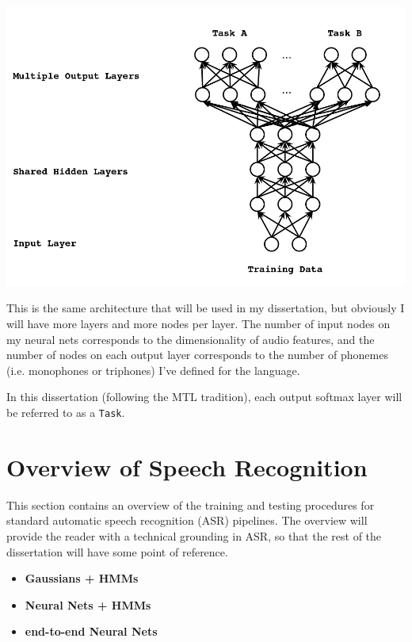 \documentclass[10pt,a4paper]{article}
\begin{document}
\begin{center}
\includegraphics[width=.85\textwidth,keepaspectratio]{figs/heigold-2013-dnn-c.png}
\end{center}

This is the same architecture that will be used in my dissertation, but obviously I will have more layers and more nodes per layer. The number of input nodes on my neural nets corresponds to the dimensionality of audio features, and the number of nodes on each output layer corresponds to the number of phonemes (i.e. monophones or triphones) I've defined for the language.

In this dissertation (following the MTL tradition), each output softmax layer will be referred to as a \texttt{Task}.


\section{Overview of Speech Recognition}

This section contains an overview of the training and testing procedures for standard automatic speech recognition (ASR) pipelines. The overview will provide the reader with a technical grounding in ASR, so that the rest of the dissertation will have some point of reference. 


\begin{itemize}

\item \textbf{Gaussians + HMMs}
  
\item \textbf{Neural Nets + HMMs}
  
\item \textbf{end-to-end Neural Nets}

\end{itemize}
\end{document}
